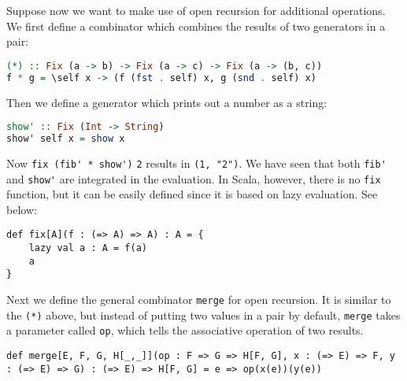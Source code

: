 Suppose now we want to make use of open recursion for additional operations. We first define a combinator which combines the results of two generators in a pair:
\begin{lstlisting}[language=Haskell,keywords={}]
(*) :: Fix (a -> b) -> Fix (a -> c) -> Fix (a -> (b, c))
f * g = \self x -> (f (fst . self) x, g (snd . self) x)
\end{lstlisting}
Then we define a generator which prints out a number as a string:
\begin{lstlisting}[language=Haskell,keywords={}]
show' :: Fix (Int -> String)
show' self x = show x
\end{lstlisting}
Now \lstinline{fix (fib'}\lstinline{ * show')} \lstinline{2} results in \lstinline{(1, "2")}. We have seen that both \lstinline{fib'} and \lstinline{show'} are integrated in the evaluation. In Scala, however, there is no \lstinline{fix} function, but it can be easily defined since it is based on lazy evaluation. See below:
\begin{lstlisting}
def fix[A](f : (=> A) => A) : A = {
    lazy val a : A = f(a)
    a
}
\end{lstlisting}
Next we define the general combinator \lstinline{merge} for open recursion. It is similar to the \lstinline{(*)} above, but instead of putting two values in a pair by default, \lstinline{merge} takes a parameter called \lstinline{op}, which tells the associative operation of two results.
\begin{lstlisting}
def merge[E, F, G, H[_,_]](op : F => G => H[F, G], x : (=> E) => F, y : (=> E) => G) : (=> E) => H[F, G] = e => op(x(e))(y(e))
\end{lstlisting}
